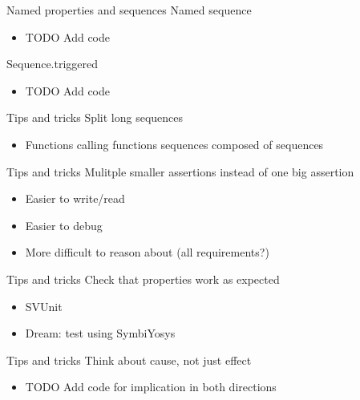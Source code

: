 \documentclass{beamer}
\begin{document}
\begin{frame}{Named properties and sequences}
Named sequence
\begin{itemize}
 \item TODO Add code
\end{itemize}
\end{frame}


\begin{frame}{Sequence.triggered}
\begin{itemize}
 \item TODO Add code
\end{itemize}
\end{frame}


\begin{frame}{Tips and tricks}
Split long sequences

\begin{itemize}
 \item Functions calling functions \textrightarrow{} sequences composed of sequences
\end{itemize}
\end{frame}


\begin{frame}{Tips and tricks}
Mulitple smaller assertions instead of one big assertion

\begin{itemize}
 \item Easier to write/read
 \item Easier to debug
 \item More difficult to reason about (all requirements?)
\end{itemize}
\end{frame}


\begin{frame}{Tips and tricks}
Check that properties work as expected

\begin{itemize}
 \item SVUnit
 \item Dream: test using SymbiYosys
\end{itemize}
\end{frame}


\begin{frame}{Tips and tricks}
Think about cause, not just effect

\begin{itemize}
 \item TODO Add code for implication in both directions
\end{itemize}
\end{frame}
\end{document}
